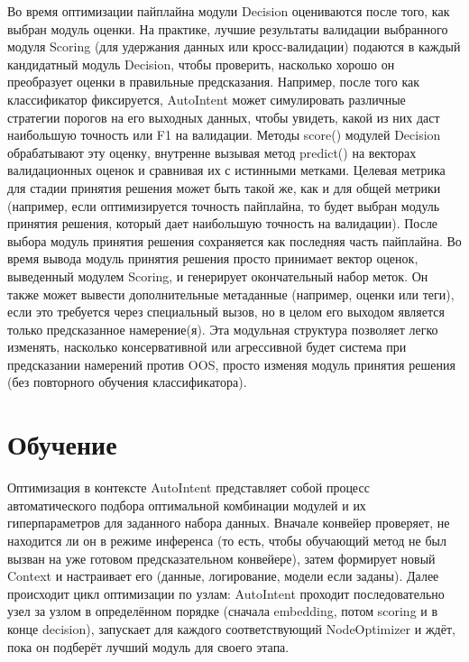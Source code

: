 \documentclass[14pt,a4paper,oneside,openany]{extbook}
\begin{document}
Во время оптимизации пайплайна модули Decision оцениваются после того, как выбран модуль оценки. На практике, лучшие результаты валидации выбранного модуля Scoring (для удержания данных или кросс-валидации) подаются в каждый кандидатный модуль Decision, чтобы проверить, насколько хорошо он преобразует оценки в правильные предсказания. Например, после того как классификатор фиксируется, AutoIntent может симулировать различные стратегии порогов на его выходных данных, чтобы увидеть, какой из них даст наибольшую точность или F1 на валидации. Методы score() модулей Decision обрабатывают эту оценку, внутренне вызывая метод predict() на векторах валидационных оценок и сравнивая их с истинными метками. Целевая метрика для стадии принятия решения может быть такой же, как и для общей метрики (например, если оптимизируется точность пайплайна, то будет выбран модуль принятия решения, который дает наибольшую точность на валидации). После выбора модуль принятия решения сохраняется как последняя часть пайплайна. Во время вывода модуль принятия решения просто принимает вектор оценок, выведенный модулем Scoring, и генерирует окончательный набор меток. Он также может вывести дополнительные метаданные (например, оценки или теги), если это требуется через специальный вызов, но в целом его выходом является только предсказанное намерение(я). Эта модульная структура позволяет легко изменять, насколько консервативной или агрессивной будет система при предсказании намерений против OOS, просто изменяя модуль принятия решения (без повторного обучения классификатора).
\section{Обучение}
\label{sec:org2e91154}
Оптимизация в контексте AutoIntent представляет собой процесс автоматического подбора оптимальной комбинации модулей и их гиперпараметров для заданного набора данных. Вначале конвейер проверяет, не находится ли он в режиме инференса (то есть, чтобы обучающий метод не был вызван на уже готовом предсказательном конвейере), затем формирует новый Context и настраивает его (данные, логирование, модели если заданы). Далее происходит цикл оптимизации по узлам: AutoIntent проходит последовательно узел за узлом в определённом порядке (сначала embedding, потом scoring и в конце decision), запускает для каждого соответствующий NodeOptimizer и ждёт, пока он подберёт лучший модуль для своего этапа.
\end{document}
